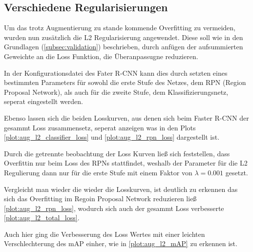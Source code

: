 \subsection{Verschiedene Regularisierungen}

Um das trotz Augmentierung zu stande kommende Overfitting zu 
vermeiden, wurden nun zusätzlich die L2 Regularisierung angewendet.
Diese soll wie in den Grundlagen (\ref{subsec:validation}) beschrieben, 
durch anfügen der aufsummierten Geweichte an die Loss Funktion, 
die Überanpassugne reduzieren.

In der Konfigurationsdatei des Fater R-CNN kann dies durch setzten eines 
bestimmten Parameters für sowohl die erste Stufe des Netzes, 
dem RPN (Region Proposal Network), als auch für die zweite Stufe,
dem Klassifizierungsnetz, seperat eingestellt werden.


Ebenso lassen sich die beiden Losskurven, aus denen sich 
beim Faster R-CNN der gesammt Loss zusammensetz,
seperat anzeigen was in den 
Plots \ref{plot:aug_l2_classifier_loss}
und \ref{plot:aug_l2_rpn_loss} dargestellt ist.

Durch die getrennte beobachtung der Loss Kurven ließ sich 
feststellen, dass Overfittin nur  beim Loss des RPNs 
stattfindet, weshalb der Parameter für die L2 Regulierung 
dann nur für die erste Stufe mit einem Faktor von
$\lambda = 0.001$ gesetzt.

Vergleicht man wieder die wieder die Losskurven, ist deutlich zu 
erkennen das sich das Overfitting im Regoin Proposal Network 
reduzieren ließ \ref{plot:aug_l2_rpn_loss}, wodurch sich 
auch der gesammt Loss verbesserte \ref{plot:aug_l2_total_loss}.

Auch hier ging die Verbesserung des Loss Wertes mit einer
leichten Verschlechterung des mAP einher, wie in 
\ref{plot:aug_l2_mAP} zu erkennen ist.



